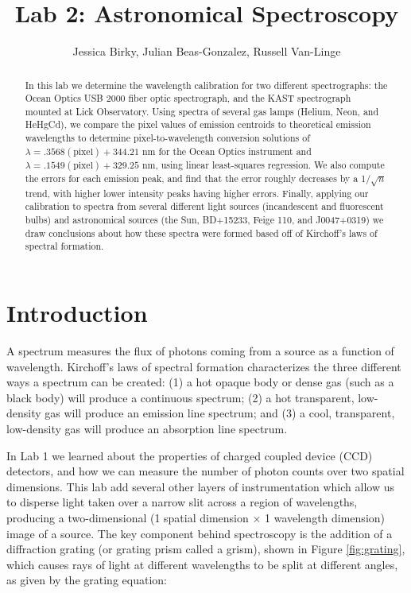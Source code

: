 \documentclass[preprint]{aastex62}
\begin{document}
\title{\sc Lab 2: Astronomical Spectroscopy}
\author{Jessica Birky, Julian Beas-Gonzalez, Russell Van-Linge}


\begin{abstract}
In this lab we determine the wavelength calibration for two different spectrographs: the Ocean Optics USB 2000 fiber optic spectrograph, and the KAST spectrograph mounted at Lick Observatory. Using spectra of several gas lamps (Helium, Neon, and HeHgCd), we compare the pixel values of emission centroids to theoretical emission wavelengths to determine pixel-to-wavelength conversion solutions of $\lambda=.3568(\mathrm{pixel})+344.21$ nm for the Ocean Optics instrument and  $\lambda=.1549(\mathrm{pixel})+329.25$ nm, using linear least-squares regression. We also compute the errors for each emission peak, and find that the error roughly decreases by a 1/$\sqrt{n}$ trend, with higher lower intensity peaks having higher errors. Finally, applying our calibration to spectra from several different light sources (incandescent and fluorescent bulbs) and astronomical sources (the Sun, BD+15233, Feige 110, and J0047+0319) we draw conclusions about how these spectra were formed based off of Kirchoff's laws of spectral formation.

\end{abstract}
\bigskip

\section{Introduction} 
A spectrum measures the flux of photons coming from a source as a function of wavelength. Kirchoff's laws of spectral formation characterizes the three different ways a spectrum can be created: (1) a hot opaque body or dense gas (such as a black body) will produce a continuous spectrum; (2) a hot transparent, low-density gas will produce an emission line spectrum; and (3) a cool, transparent, low-density gas will produce an absorption line spectrum. 

In Lab 1 we learned about the properties of charged coupled device (CCD) detectors, and how we can measure the number of photon counts over two spatial dimensions. This lab add several other layers of instrumentation which allow us to disperse light taken over a narrow slit across a region of wavelengths, producing a two-dimensional (1 spatial dimension $\times$ 1 wavelength dimension) image of a source. The key component behind spectroscopy is the addition of a diffraction grating (or grating prism called a grism), shown in Figure \ref{fig:grating}, which causes rays of light at different wavelengths to be split at different angles, as given by the grating equation:
\end{document}
